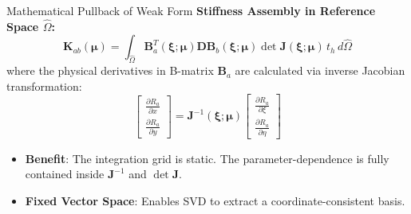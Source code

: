 \documentclass[aspectratio=169, 10pt]{beamer}
\newcommand{\mat}[1]{\mathbf{#1}}
\begin{document}
\begin{frame}{Mathematical Pullback of Weak Form}
    \textbf{Stiffness Assembly in Reference Space $\hat{\Omega}$:}
    \begin{equation*}
        \mat{K}_{ab}(\boldsymbol{\mu}) = \int_{\hat{\Omega}} \mat{B}_a^T(\boldsymbol{\xi}; \boldsymbol{\mu}) \mat{D} \mat{B}_b(\boldsymbol{\xi}; \boldsymbol{\mu}) \det\mat{J}(\boldsymbol{\xi}; \boldsymbol{\mu}) \, t_h \, d\hat{\Omega}
    \end{equation*}
    where the physical derivatives in B-matrix $\mat{B}_a$ are calculated via inverse Jacobian transformation:
    \begin{equation*}
        \begin{bmatrix} \frac{\partial R_a}{\partial x} \\[0.3em] \frac{\partial R_a}{\partial y} \end{bmatrix} = \mat{J}^{-1}(\boldsymbol{\xi}; \boldsymbol{\mu}) \begin{bmatrix} \frac{\partial R_a}{\partial \xi} \\[0.3em] \frac{\partial R_a}{\partial \eta} \end{bmatrix}
    \end{equation*}
    \begin{itemize}
        \item \textbf{Benefit}: The integration grid is static. The parameter-dependence is fully contained inside $\mat{J}^{-1}$ and $\det\mat{J}$.
        \item \textbf{Fixed Vector Space}: Enables SVD to extract a coordinate-consistent basis.
    \end{itemize}
\end{frame}
\end{document}
